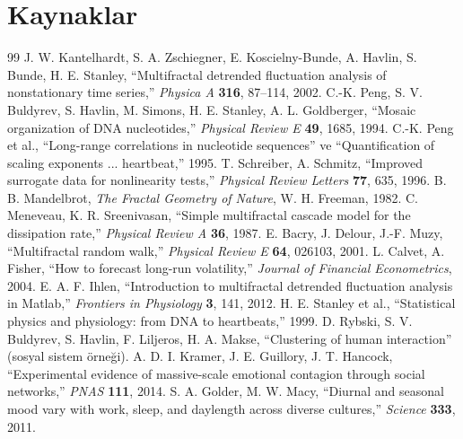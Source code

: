 \documentclass[11pt,a4paper]{article}
\begin{document}
\section*{Kaynaklar}
\begin{thebibliography}{99}
 J. W. Kantelhardt, S. A. Zschiegner, E. Koscielny-Bunde,
A. Havlin, S. Bunde, H. E. Stanley, ``Multifractal detrended fluctuation
analysis of nonstationary time series,'' \emph{Physica A} \textbf{316}, 87--114, 2002.
 C.-K. Peng, S. V. Buldyrev, S. Havlin, M. Simons,
H. E. Stanley, A. L. Goldberger, ``Mosaic organization of DNA nucleotides,''
\emph{Physical Review E} \textbf{49}, 1685, 1994.
 C.-K. Peng et al., ``Long-range correlations in nucleotide
sequences'' ve ``Quantification of scaling exponents ... heartbeat,'' 1995.
 T. Schreiber, A. Schmitz, ``Improved surrogate data for
nonlinearity tests,'' \emph{Physical Review Letters} \textbf{77}, 635, 1996.
 B. B. Mandelbrot, \emph{The Fractal Geometry of Nature},
W. H. Freeman, 1982.
 C. Meneveau, K. R. Sreenivasan, ``Simple multifractal
cascade model for the dissipation rate,'' \emph{Physical Review A} \textbf{36}, 1987.
 E. Bacry, J. Delour, J.-F. Muzy, ``Multifractal random
walk,'' \emph{Physical Review E} \textbf{64}, 026103, 2001.
 L. Calvet, A. Fisher, ``How to forecast long-run
volatility,'' \emph{Journal of Financial Econometrics}, 2004.
 E. A. F. Ihlen, ``Introduction to multifractal detrended
fluctuation analysis in Matlab,'' \emph{Frontiers in Physiology} \textbf{3}, 141, 2012.
 H. E. Stanley et al., ``Statistical physics and
physiology: from DNA to heartbeats,'' 1999.
 D. Rybski, S. V. Buldyrev, S. Havlin, F. Liljeros,
H. A. Makse, ``Clustering of human interaction'' (sosyal sistem örneği).
 A. D. I. Kramer, J. E. Guillory, J. T. Hancock,
``Experimental evidence of massive-scale emotional contagion through social
networks,'' \emph{PNAS} \textbf{111}, 2014.
 S. A. Golder, M. W. Macy, ``Diurnal and seasonal mood
vary with work, sleep, and daylength across diverse cultures,''
\emph{Science} \textbf{333}, 2011.
\end{thebibliography}
\end{document}
